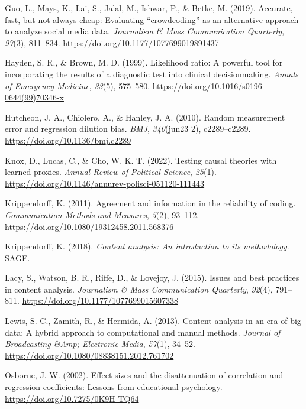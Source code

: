 \documentclass[english,man,floatsintext]{apa6}
\begin{document}
\leavevmode\hypertarget{ref-guo:2019:AFB}{}%
Guo, L., Mays, K., Lai, S., Jalal, M., Ishwar, P., \& Betke, M. (2019). Accurate, fast, but not always cheap: Evaluating ``crowdcoding'' as an alternative approach to analyze social media data. \emph{Journalism \& Mass Communication Quarterly}, \emph{97}(3), 811--834. \url{https://doi.org/10.1177/1077699019891437}

\leavevmode\hypertarget{ref-hayden:1999:LR}{}%
Hayden, S. R., \& Brown, M. D. (1999). Likelihood ratio: A powerful tool for incorporating the results of a diagnostic test into clinical decisionmaking. \emph{Annals of Emergency Medicine}, \emph{33}(5), 575--580. \url{https://doi.org/10.1016/s0196-0644(99)70346-x}

\leavevmode\hypertarget{ref-hutcheon:2010:R}{}%
Hutcheon, J. A., Chiolero, A., \& Hanley, J. A. (2010). Random measurement error and regression dilution bias. \emph{BMJ}, \emph{340}(jun23 2), c2289--c2289. \url{https://doi.org/10.1136/bmj.c2289}

\leavevmode\hypertarget{ref-knox:2022:TCT}{}%
Knox, D., Lucas, C., \& Cho, W. K. T. (2022). Testing causal theories with learned proxies. \emph{Annual Review of Political Science}, \emph{25}(1). \url{https://doi.org/10.1146/annurev-polisci-051120-111443}

\leavevmode\hypertarget{ref-krippendorff:2011:AIR}{}%
Krippendorff, K. (2011). Agreement and information in the reliability of coding. \emph{Communication Methods and Measures}, \emph{5}(2), 93--112. \url{https://doi.org/10.1080/19312458.2011.568376}

\leavevmode\hypertarget{ref-krippendorff2018content}{}%
Krippendorff, K. (2018). \emph{Content analysis: An introduction to its methodology}. SAGE.

\leavevmode\hypertarget{ref-lacy:2015:IBP}{}%
Lacy, S., Watson, B. R., Riffe, D., \& Lovejoy, J. (2015). Issues and best practices in content analysis. \emph{Journalism \& Mass Communication Quarterly}, \emph{92}(4), 791--811. \url{https://doi.org/10.1177/1077699015607338}

\leavevmode\hypertarget{ref-lewis:2013:CAE}{}%
Lewis, S. C., Zamith, R., \& Hermida, A. (2013). Content analysis in an era of big data: A hybrid approach to computational and manual methods. \emph{Journal of Broadcasting \&Amp; Electronic Media}, \emph{57}(1), 34--52. \url{https://doi.org/10.1080/08838151.2012.761702}

\leavevmode\hypertarget{ref-osborne:2002:ESD}{}%
Osborne, J. W. (2002). Effect sizes and the disattenuation of correlation and regression coefficients: Lessons from educational psychology. \url{https://doi.org/10.7275/0K9H-TQ64}
\end{document}
